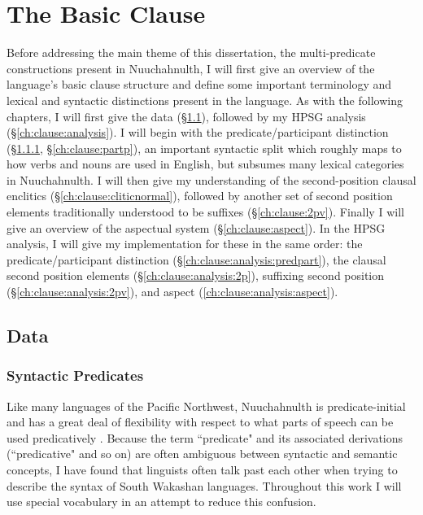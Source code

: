 \chapter{The Basic Clause} \label{ch:clause}

Before addressing the main theme of this dissertation, the multi-predicate constructions present in Nuuchahnulth, I will first give an overview of the language's basic clause structure and define some important terminology and lexical and syntactic distinctions present in the language. As with the following chapters, I will first give the data (\S\ref{ch:clause:data}), followed by my HPSG analysis (\S\ref{ch:clause:analysis}). I will begin with the predicate/participant distinction (\S\ref{ch:clause:predp}, \S\ref{ch:clause:partp}), an important syntactic split which roughly maps to how verbs and nouns are used in English, but subsumes many lexical categories in Nuuchahnulth. I will then give my understanding of the second-position clausal enclitics (\S\ref{ch:clause:cliticnormal}), followed by another set of second position elements traditionally understood to be suffixes (\S\ref{ch:clause:2pv}). Finally I will give an overview of the aspectual system (\S\ref{ch:clause:aspect}). In the HPSG analysis, I will give my implementation for these in the same order: the predicate/participant distinction (\S\ref{ch:clause:analysis:predpart}), the clausal second position elements (\S\ref{ch:clause:analysis:2p}), suffixing second position (\S\ref{ch:clause:analysis:2pv}), and aspect (\ref{ch:clause:analysis:aspect}).

\section{Data} \label{ch:clause:data}

\subsection{Syntactic Predicates} \label{ch:clause:predp}

Like many languages of the Pacific Northwest, Nuuchahnulth is predicate-initial and has a great deal of flexibility with respect to what parts of speech can be used predicatively \citep{jacobsen1979}. Because the term ``predicate" and its associated derivations (``predicative" and so on) are often ambiguous between syntactic and semantic concepts, I have found that linguists often talk past each other when trying to describe the syntax of South Wakashan languages. Throughout this work I will use special vocabulary in an attempt to reduce this confusion.

